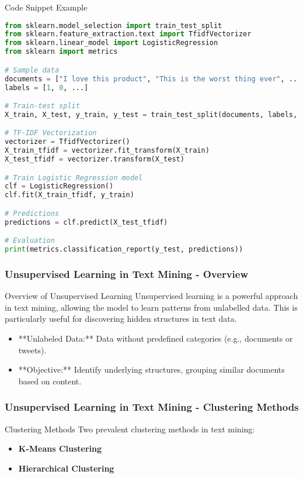 \documentclass[aspectratio=169]{beamer}
\begin{document}
\begin{frame}[fragile]{Code Snippet Example}
    \begin{lstlisting}[language=Python]
from sklearn.model_selection import train_test_split
from sklearn.feature_extraction.text import TfidfVectorizer
from sklearn.linear_model import LogisticRegression
from sklearn import metrics

# Sample data
documents = ["I love this product", "This is the worst thing ever", ...]
labels = [1, 0, ...]

# Train-test split
X_train, X_test, y_train, y_test = train_test_split(documents, labels, test_size=0.2)

# TF-IDF Vectorization
vectorizer = TfidfVectorizer()
X_train_tfidf = vectorizer.fit_transform(X_train)
X_test_tfidf = vectorizer.transform(X_test)

# Train Logistic Regression model
clf = LogisticRegression()
clf.fit(X_train_tfidf, y_train)

# Predictions
predictions = clf.predict(X_test_tfidf)

# Evaluation
print(metrics.classification_report(y_test, predictions))
    \end{lstlisting}
\end{frame}

\begin{frame}[fragile]
    \frametitle{Unsupervised Learning in Text Mining - Overview}
    \begin{block}{Overview of Unsupervised Learning}
        Unsupervised learning is a powerful approach in text mining, allowing the model to learn patterns from unlabelled data. This is particularly useful for discovering hidden structures in text data.
    \end{block}
    
    \begin{itemize}
        \item **Unlabeled Data:** Data without predefined categories (e.g., documents or tweets).
        \item **Objective:** Identify underlying structures, grouping similar documents based on content.
    \end{itemize}
\end{frame}

\begin{frame}[fragile]
    \frametitle{Unsupervised Learning in Text Mining - Clustering Methods}
    \begin{block}{Clustering Methods}
        Two prevalent clustering methods in text mining:
        \begin{itemize}
            \item \textbf{K-Means Clustering}
            \item \textbf{Hierarchical Clustering}
        \end{itemize}
    \end{block}
\end{frame}
\end{document}
